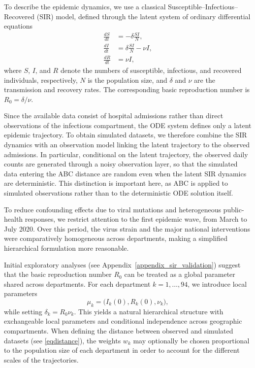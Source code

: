 \documentclass[lineno]{biometrika}
\def\locparam{\mu}
\begin{document}
To describe the epidemic dynamics, we use a classical Susceptible--Infectious--Recovered (SIR) model, defined through the latent system of ordinary differential equations
\begin{equation}
    \label{eqSIR}
    \begin{split}
        \frac{dS}{dt} &= -\delta \frac{SI}{N},\\
        \frac{dI}{dt} &= \delta \frac{SI}{N} - \nu I,\\
        \frac{dR}{dt} &= \nu I,
    \end{split}
\end{equation}
where \(S\), \(I\), and \(R\) denote the numbers of susceptible, infectious, and recovered individuals, respectively, \(N\) is the population size, and \(\delta\) and \(\nu\) are the transmission and recovery rates. The corresponding basic reproduction number is \(R_0 = \delta / \nu\).

Since the available data consist of hospital admissions rather than direct observations of the infectious compartment, the ODE system defines only a latent epidemic trajectory. To obtain simulated datasets, we therefore combine the SIR dynamics with an observation model linking the latent trajectory to the observed admissions. In particular, conditional on the latent trajectory, the observed daily counts are generated through a noisy observation layer, so that the simulated data entering the ABC distance are random even when the latent SIR dynamics are deterministic. This distinction is important here, as ABC is applied to simulated observations rather than to the deterministic ODE solution itself.

To reduce confounding effects due to viral mutations and heterogeneous public-health responses, we restrict attention to the first epidemic wave, from March to July 2020. Over this period, the virus strain and the major national interventions were comparatively homogeneous across departments, making a simplified hierarchical formulation more reasonable.

Initial exploratory analyses (see Appendix~\ref{appendix_sir_validation}) suggest that the basic reproduction number \(R_0\) can be treated as a global parameter shared across departments. For each department \(k=1,\dots,94\), we introduce local parameters
\[
\locparam_k = \bigl(I_k(0), R_k(0), \nu_k\bigr),
\]
while setting \(\delta_k = R_0 \nu_k\). This yields a natural hierarchical structure with exchangeable local parameters and conditional independence across geographic compartments. When defining the distance between observed and simulated datasets (see \eqref{eqdistance}), the weights \(w_k\) may optionally be chosen proportional to the population size of each department in order to account for the different scales of the trajectories.
\end{document}

